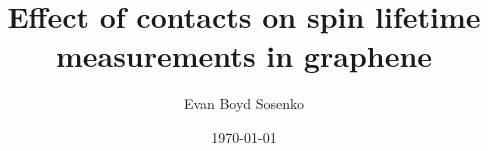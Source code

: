 \documentclass[aps,prl,preprint,groupedaddress]{revtex4-1}
\begin{document}
  \author{Evan Boyd Sosenko}
  \title{Effect of contacts on spin lifetime measurements in graphene}
  \date{\today}
  
  \maketitle
  
\end{document}
